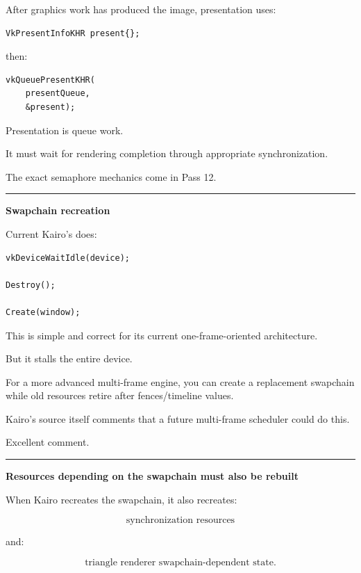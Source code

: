 After graphics work has produced the image, presentation uses:

\begin{verbatim}
VkPresentInfoKHR present{};
\end{verbatim}

then:

\begin{verbatim}
vkQueuePresentKHR(
    presentQueue,
    &present);
\end{verbatim}

Presentation is queue work.

It must wait for rendering completion through appropriate synchronization.

The exact semaphore mechanics come in Pass 12.

\begin{center}\rule{0.5\linewidth}{0.5pt}\end{center}

\textbf{Swapchain recreation}

Current Kairo's  does:

\begin{verbatim}
vkDeviceWaitIdle(device);

Destroy();

Create(window);
\end{verbatim}

This is simple and correct for its current one-frame-oriented architecture.

But it stalls the entire device.

For a more advanced multi-frame engine, you can create a replacement swapchain while old resources retire after fences/timeline values.

Kairo's source itself comments that a future multi-frame scheduler could do this.

Excellent comment.

\begin{center}\rule{0.5\linewidth}{0.5pt}\end{center}

\textbf{Resources depending on the swapchain must also be rebuilt}

When Kairo recreates the swapchain, it also recreates:

\[
\text{synchronization resources}
\]

and:

\[
\text{triangle renderer swapchain-dependent state}.
\]

